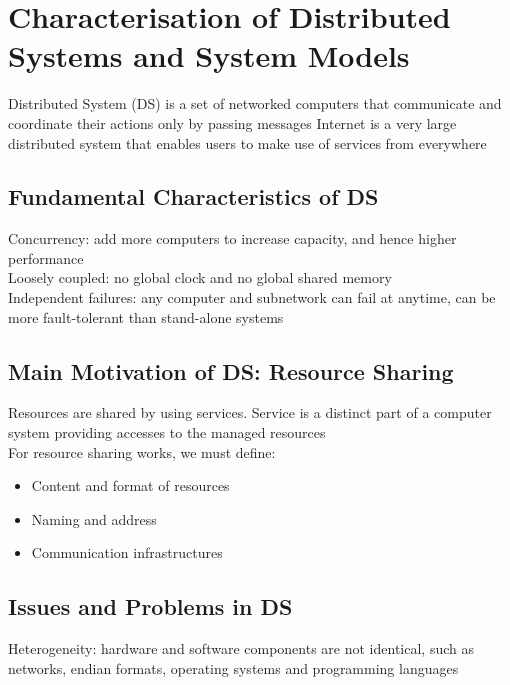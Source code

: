 \chapter{Characterisation of Distributed Systems and System Models}

\begin{multicols*}{2}

\noindent Distributed System (DS) is a set of networked computers that communicate and coordinate their actions only by passing messages
Internet is a very large distributed system that enables users to make use of services from everywhere

\section{Fundamental Characteristics of DS}

\noindent Concurrency: add more computers to increase capacity, and hence higher performance \\

\noindent Loosely coupled: no global clock and no global shared memory \\

\noindent Independent failures: any computer and subnetwork can fail at anytime, can be more fault-tolerant than stand-alone systems \\

\section {Main Motivation of DS: Resource Sharing}
\noindent Resources are shared by using services. Service is a distinct part of a computer system providing accesses to the managed resources \\

\noindent For resource sharing works, we must define:
\begin{itemize}
    \item Content and format of resources
    \item Naming and address
    \item Communication infrastructures
\end{itemize}

\section{Issues and Problems in DS}

\noindent Heterogeneity: hardware and software components are not identical, such as networks, endian formats, operating systems and programming languages\\


\end{multicols*}
